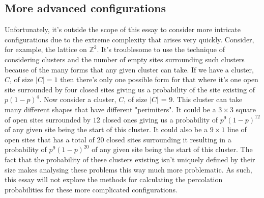 \subsection{More advanced configurations}
Unfortunately, it's outside the scope of this essay to consider more intricate configurations due to the extreme complexity that arises very quickly. Consider, for example, the
lattice on $\mathbb{Z}^2$. It's troublesome to use the technique of considering clusters and the number of empty sites surrounding such clusters because of the many forms that any
given cluster can take. If we have a cluster, $C$, of size $|C| = 1$ then there's only one possible form for that where it's one open site surrounded by four closed sites giving us a
probability of the site existing of $p(1-p)^4$. Now consider a cluster, $C$, of size $|C|$ = 9. This cluster can take many different shapes that have different "perimiters". It could
be a $3 \times 3$ square of open sites surrounded by $12$ closed ones giving us a probability of $p^9(1-p)^{12}$ of any given site being the start of this cluster. It could also be a $9 \times 1$ line of
open sites that has a total of $20$ closed sites surrounding it resulting in a probability of $p^9(1-p)^{20}$ of any given site being the start of this cluster. The fact that the probability of these
clusters existing isn't uniquely defined by their size makes analysing these problems this way much more problematic. As such, this essay will not explore the methods for
calculating the percolation probabilities for these more complicated configurations.
